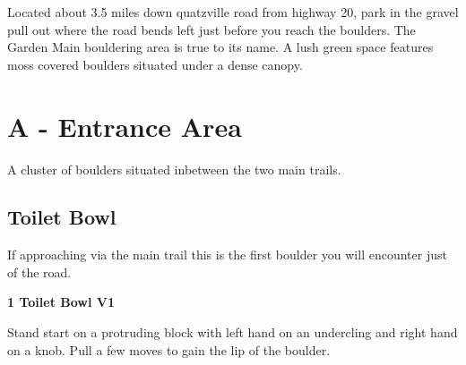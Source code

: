 







\raggedcolumns
\begin{multicols}{2}


\end{multicols}
\begin{multicols}{2}
Located about 3.5 miles down quatzville road from highway 20, park in the gravel pull out where the road bends left just before you reach the boulders. The Garden Main bouldering area is true to its name. A lush green space features moss covered boulders situated under a dense canopy.\\



\newpage


		\section{A - Entrance Area}\label{sa:Entrance Area}
	A cluster of boulders situated inbetween the two main trails.\\

	
	


		\needspace{1.5cm}
		\subsection*{Toilet Bowl}\label{bf:Toilet Bowl}
		If approaching via the main trail this is the first boulder you will encounter just of the road.\\
	
		
			
			\needspace{1.5cm}
\label{rt:Toilet Bowl}
\colorbox{green!20}{
\parbox{0.95\linewidth}{
\textbf{
1 Toilet Bowl V1  
}}}

			\begin{adjustwidth}{0.5cm}{}			
			Stand start on a protruding block with left hand on an undercling and right hand on a knob. Pull a few moves to gain the lip of the boulder.
			\end{adjustwidth}
			

\end{multicols}
